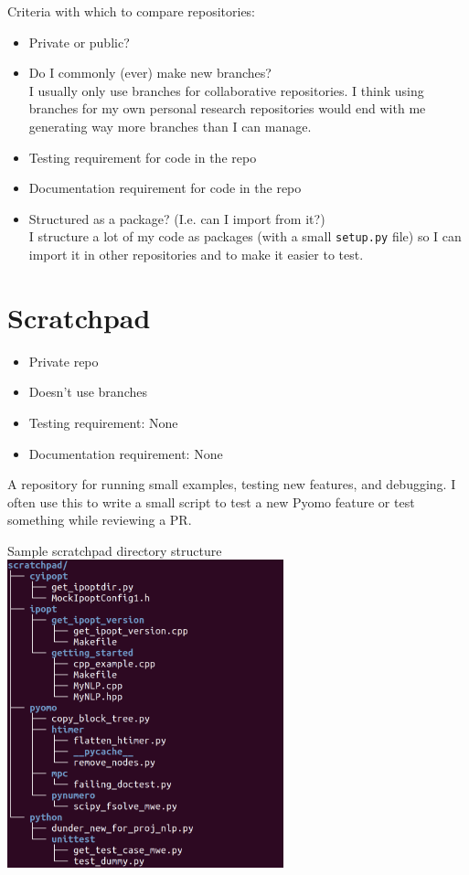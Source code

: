 \documentclass{article}
\begin{document}
\noindent Criteria with which to compare repositories:
\begin{itemize}
  \item Private or public?
  \item Do I commonly (ever) make new branches?\\
    I usually only use branches for collaborative repositories.
    I think using branches for my own personal research repositories
    would end with me generating way more branches than I can manage.
  \item Testing requirement for code in the repo
  \item Documentation requirement for code in the repo
  \item Structured as a package? (I.e. can I import from it?)\\
    I structure a lot of my code as packages (with a small \texttt{setup.py} file)
    so I can import it in other repositories and to make it easier to test.
\end{itemize}

\section{Scratchpad}
\begin{itemize}
  \item Private repo
  \item Doesn't use branches
  \item Testing requirement: None
  \item Documentation requirement: None
\end{itemize}
A repository for running small examples, testing new features, and
debugging. I often use this to write a small script to test a new
Pyomo feature or test something while reviewing a PR.

\begin{center}
  \newpage
  Sample scratchpad directory structure\\
  \includegraphics[width=8cm]{scratchpad_tree.png}
\end{center}
\end{document}
